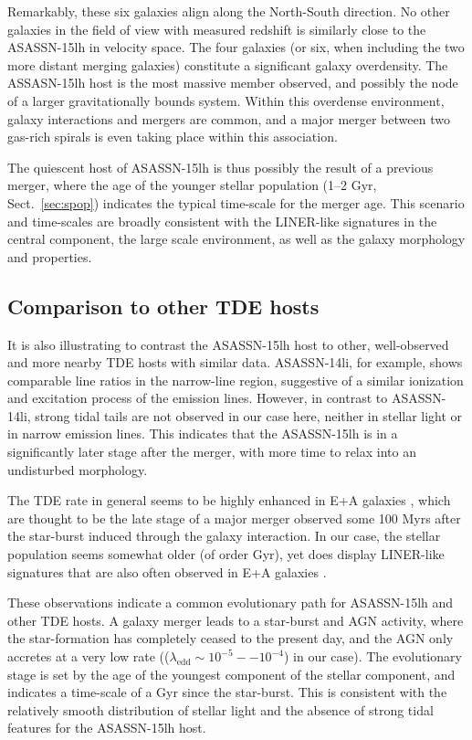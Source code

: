 \documentclass[traditabstract]{aa}
\begin{document}
Remarkably, these six galaxies align along the North-South direction. No other galaxies in the field of view with measured redshift is similarly close to the ASASSN-15lh in velocity space. The four galaxies (or six, when including the two more distant merging galaxies) constitute a significant galaxy overdensity. The ASSASN-15lh host is the most massive member observed, and possibly the node of a larger gravitationally bounds system. Within this overdense environment, galaxy interactions and mergers are common, and a major merger between two gas-rich spirals is even taking place within this association. 

The quiescent host of ASASSN-15lh is thus possibly the result of a previous merger, where the age of the younger stellar population (1--2 Gyr, Sect.~\ref{sec:spop}) indicates the typical time-scale for the merger age. This scenario and time-scales are broadly consistent with the LINER-like signatures in the central component, the large scale environment, as well as the galaxy morphology and properties.

\subsection{Comparison to other TDE hosts}

It is also illustrating to contrast the ASASSN-15lh host to other, well-observed and more nearby TDE hosts with similar data. ASASSN-14li, for example, shows comparable line ratios in the narrow-line region, suggestive of a similar ionization and excitation process of the emission lines. However, in contrast to ASASSN-14li, strong tidal tails are not observed in our case here, neither in stellar light or in narrow emission lines. This indicates that the ASASSN-15lh is in a significantly later stage after the merger, with more time to relax into an undisturbed morphology.

The TDE rate in general seems to be highly enhanced in E+A galaxies \citep{2014ApJ...793...38A, 2016ApJ...818L..21F}, which are thought to be the late stage of a major merger observed some 100 Myrs after the star-burst induced through the galaxy interaction. In our case, the stellar population seems somewhat older (of order Gyr), yet does display LINER-like signatures that are also often observed in E+A galaxies \citep{2006ApJ...646L..33Y}.

These observations indicate a common evolutionary path for ASASSN-15lh and other TDE hosts. A galaxy merger leads to a star-burst and AGN activity, where the star-formation has completely ceased to the present day, and the AGN only accretes at a very low rate (($\lambda_{\mathrm{edd}}\sim10^{-5}--10^{-4}$) in our case). The evolutionary stage is set by the age of the youngest component of the stellar component, and indicates a time-scale of a Gyr since the star-burst. This is consistent with the relatively smooth distribution of stellar light and the absence of strong tidal features for the ASASSN-15lh host.
\end{document}
